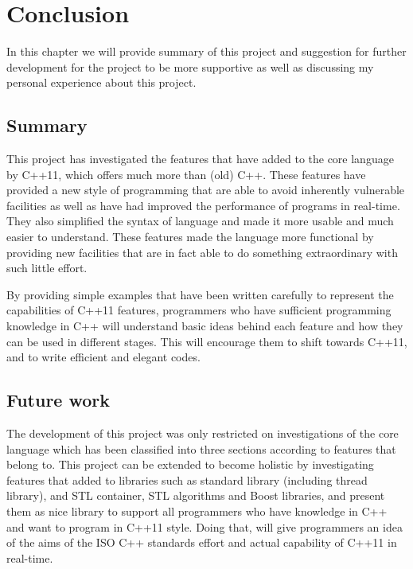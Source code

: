 \documentclass[11pt]{report}
\begin{document}
\chapter{Conclusion}
\label{chapter: conclusion}
In this chapter we will provide summary of this project and suggestion for further development for the project to be more supportive as well as discussing my personal experience about this project.
\section{Summary}
\label{se : summary}
This project has investigated the features that have added to the core language by C++11, which offers much more than (old) C++. These features have provided a new style of programming that are able to avoid inherently vulnerable facilities as well as have had improved the performance of programs in real-time. They also simplified the syntax of language and made it more usable and much easier to understand. These features made the language more functional by providing new facilities that are in fact able to do something extraordinary with such little effort.

By providing simple examples that have been written carefully to represent the capabilities of C++11 features, programmers who have sufficient programming knowledge in C++ will understand basic ideas behind each feature and how they can be used in different stages. This will encourage them to shift towards C++11, and to write efficient and elegant codes.
\section{Future work}
\label{sec: future work}
The development of this project was only restricted on investigations of the core language which has been classified into three sections according to features that belong to. This project can be extended to become holistic by investigating features that added to libraries such as standard library (including thread library), and STL container, STL algorithms and Boost libraries, and present them as nice library to support all programmers who have knowledge in C++ and want to program in C++11 style. Doing that, will give programmers an idea of the aims of the ISO C++ standards effort and actual capability of C++11 in real-time.
\end{document}
